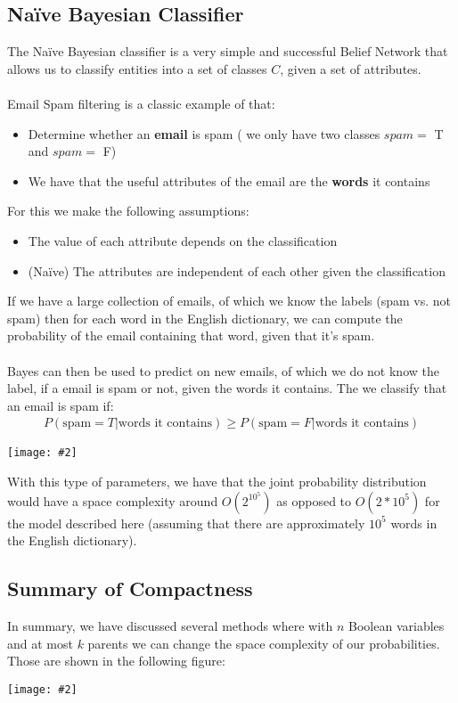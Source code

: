 \documentclass{article}
\def\blu#1{{\color{blu}#1}}
\newcommand{\centerfig}[2]{\begin{center}\texttt{[image: \#2]}\end{center}}
\begin{document}
\subsection*{Naïve Bayesian Classifier}
The Naïve Bayesian classifier is a very simple and successful Belief Network that allows us to classify \blu{entities} into a \blu{set of classes} $ C $, given a \blu{set of attributes}. \\
\\
Email Spam filtering is a classic example of that:
\begin{itemize}
	\item Determine whether an \textbf{email} is spam  ( we only have two classes $ spam =$ T and $ spam= $ F)
	\item We have that the useful attributes of the email are the \textbf{words} it contains
\end{itemize}
For this we make the following assumptions:
\begin{itemize}
	\item The value of each attribute depends on the classification
	\item (Naïve) The attributes are independent of each other given the classification
\end{itemize}
If we have a large collection of emails, of which we know the labels (spam vs. not spam) then for each word in the English dictionary, we can compute the probability of the email containing that word, given that it's spam. \\
\\
Bayes can then be used to predict on new emails, of which we do not know the label, if a email is spam or not, given the words it contains. The we classify that an email is spam if:
\begin{align*}
P(\text{spam} = T | \text{words it contains}) \ge P(\text{spam} = F | \text{words it contains})
\end{align*}
\centerfig{0.75}{BN-11}
With this type of parameters, we have that the joint probability distribution would have a space complexity around $ O(2^{10^5}) $ as opposed to $ O(2*10^5) $ for the model described here (assuming that there are approximately $ 10^5 $ words in the English dictionary).

\subsection*{Summary of Compactness}
In summary, we have discussed several methods where with $ n $ Boolean variables and at most $ k $ parents we can change the space complexity of our probabilities. Those are shown in the following figure:
\centerfig{0.8}{BNet-1}
\end{document}
